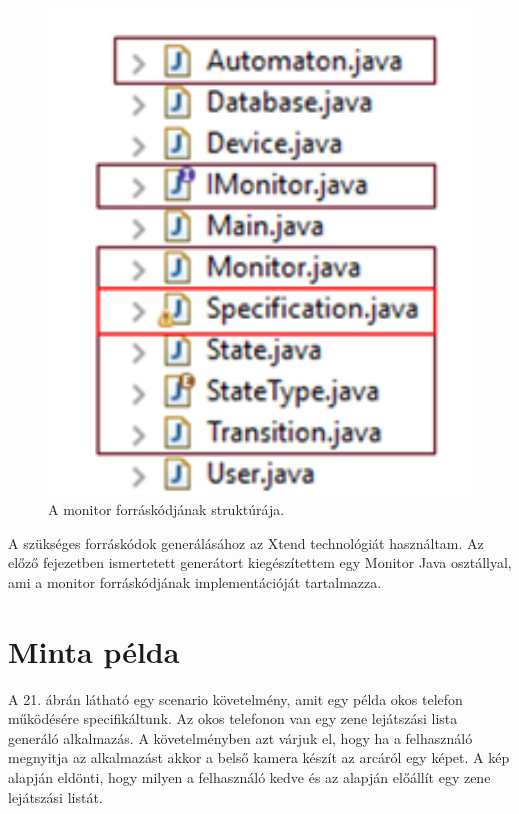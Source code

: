\begin{figure}[!ht]
    \centering
    \includegraphics[width=150mm, keepaspectratio]{figures/18abra.png}
    \caption{A monitor forráskódjának struktúrája.}
\end{figure}

A szükséges forráskódok generálásához az Xtend technológiát használtam. Az előző fejezetben ismertetett generátort kiegészítettem egy Monitor Java osztállyal, ami a monitor forráskódjának implementációját tartalmazza.

\section{Minta példa}

A 21. ábrán látható egy scenario követelmény, amit egy példa okos telefon működésére specifikáltunk. Az okos telefonon van egy zene lejátszási lista generáló alkalmazás. A követelményben azt várjuk el, hogy ha a felhasználó megnyitja az alkalmazást akkor a belső kamera készít az arcáról egy képet. A kép alapján eldönti, hogy milyen a felhasználó kedve és az alapján előállít egy zene lejátszási listát.

